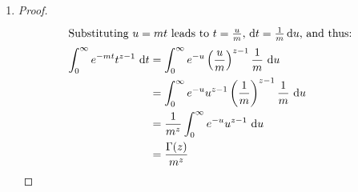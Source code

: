 \documentclass[12pt]{article}
\begin{document}
\begin{enumerate}
\begin{enumerate}
\item
{}
\begin{proof}
\begin{align*}
\intertext{Substituting $u=mt$ leads to $t=\frac{u}{m}$, $ \mathop{}\!\mathrm{d} t = \frac{1}{m} \mathop{}\!\mathrm{d} u $, and thus:}
\int_0^{\infty} e^{-mt}t^{z-1} \, \mathop{}\!\mathrm{d} t &= \int_0^{\infty} e^{-u} \left(\frac{u}{m}\right)^{z-1} \frac{1}{m} \, \mathop{}\!\mathrm{d} u \\
&= \int_0^{\infty} e^{-u} u^{z-1} \left(\frac{1}{m}\right)^{z-1} \frac{1}{m} \, \mathop{}\!\mathrm{d} u \\
&= \frac{1}{m^{z}} \int_0^{\infty} e^{-u} u^{z-1} \, \mathop{}\!\mathrm{d} u \\
&= \frac{\Gamma(z)}{m^{z}}
\end{align*}
\end{proof}


\end{enumerate}
\end{enumerate}
\end{document}
